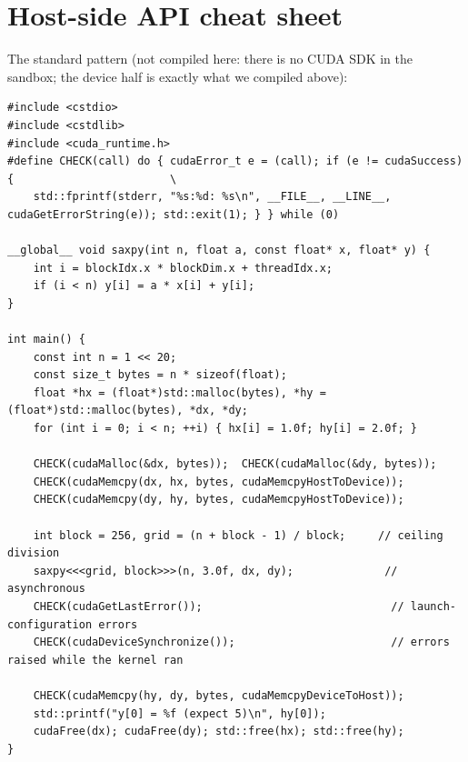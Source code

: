 \documentclass[10pt,a4paper,openany,oneside]{report}
\newcommand{\prio}[1]{\texorpdfstring{\ifcase#1\or{\color{gold}\ding{72}}\or{\color{gold}\ding{72}\ding{72}}\or{\color{gold}\ding{72}\ding{72}\ding{72}}\fi}{}}
\begin{document}
\section{Host-side API cheat sheet \prio{2}}
The standard pattern (not compiled here: there is no CUDA SDK in the sandbox; the device half is exactly what we compiled above):
\begin{lstlisting}[language={CUDA},basicstyle=\ttfamily\scriptsize,title={saxpy.cu: allocate, copy, launch, check, copy back}]
#include <cstdio>
#include <cstdlib>
#include <cuda_runtime.h>
#define CHECK(call) do { cudaError_t e = (call); if (e != cudaSuccess) {                        \
    std::fprintf(stderr, "%s:%d: %s\n", __FILE__, __LINE__, cudaGetErrorString(e)); std::exit(1); } } while (0)

__global__ void saxpy(int n, float a, const float* x, float* y) {
    int i = blockIdx.x * blockDim.x + threadIdx.x;
    if (i < n) y[i] = a * x[i] + y[i];
}

int main() {
    const int n = 1 << 20;
    const size_t bytes = n * sizeof(float);
    float *hx = (float*)std::malloc(bytes), *hy = (float*)std::malloc(bytes), *dx, *dy;
    for (int i = 0; i < n; ++i) { hx[i] = 1.0f; hy[i] = 2.0f; }

    CHECK(cudaMalloc(&dx, bytes));  CHECK(cudaMalloc(&dy, bytes));
    CHECK(cudaMemcpy(dx, hx, bytes, cudaMemcpyHostToDevice));
    CHECK(cudaMemcpy(dy, hy, bytes, cudaMemcpyHostToDevice));

    int block = 256, grid = (n + block - 1) / block;     // ceiling division
    saxpy<<<grid, block>>>(n, 3.0f, dx, dy);              // asynchronous
    CHECK(cudaGetLastError());                             // launch-configuration errors
    CHECK(cudaDeviceSynchronize());                        // errors raised while the kernel ran

    CHECK(cudaMemcpy(hy, dy, bytes, cudaMemcpyDeviceToHost));
    std::printf("y[0] = %f (expect 5)\n", hy[0]);
    cudaFree(dx); cudaFree(dy); std::free(hx); std::free(hy);
}
\end{lstlisting}
\end{document}
